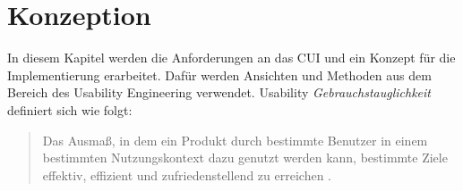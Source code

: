 \chapter{Konzeption}
\label{cha:konzeption}
In diesem Kapitel werden die Anforderungen an das \ac{CUI}  und ein Konzept für die Implementierung erarbeitet. Dafür werden Ansichten und Methoden aus dem Bereich des Usability Engineering verwendet. Usability \bzw \textit{Gebrauchstauglichkeit} definiert sich wie folgt:

\begin{quote}
    Das Ausmaß, in dem ein Produkt durch bestimmte Benutzer in einem bestimmten Nutzungskontext dazu genutzt werden kann, bestimmte Ziele effektiv, effizient und zufriedenstellend zu erreichen \cite{richter-ux-compact}.
\end{quote}

